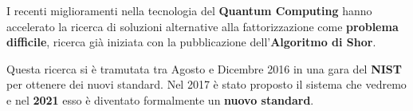 I recenti miglioramenti nella tecnologia del \textbf{Quantum Computing} hanno accelerato la ricerca di soluzioni alternative alla fattorizzazione come \textbf{problema difficile}, ricerca già iniziata con la pubblicazione dell'\textbf{Algoritmo di Shor}.

\vspace{\baselineskip}

Questa ricerca si è tramutata tra Agosto e Dicembre 2016 in una gara del \textbf{NIST} per ottenere dei nuovi standard. Nel 2017 è stato proposto il sistema che vedremo e nel \textbf{2021} esso è diventato formalmente un \textbf{nuovo standard}.

